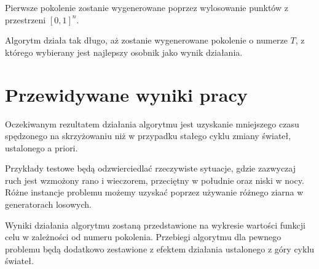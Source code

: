\documentclass[a4paper]{article}
\begin{document}
Pierwsze pokolenie zostanie wygenerowane poprzez wylosowanie punktów z
przestrzeni $[0, 1]^n$.

Algorytm działa tak długo, aż zostanie wygenerowane pokolenie o numerze $T$,
z którego wybierany jest najlepszy osobnik jako wynik działania.

\section{Przewidywane wyniki pracy}
Oczekiwanym rezultatem działania algorytmu jest uzyskanie mniejszego czasu
spędzonego na skrzyżowaniu niż w przypadku stałego cyklu zmiany świateł,
ustalonego a priori.

Przykłady testowe będą odzwierciedlać rzeczywiste sytuacje, gdzie zazwyczaj
ruch jest wzmożony rano i wieczorem, przeciętny w południe oraz niski w nocy.
Różne instancje problemu możemy uzyskać poprzez używanie różnego ziarna
w generatorach losowych.

Wyniki działania algorytmu zostaną przedstawione na wykresie wartości funkcji
celu w zależności od numeru pokolenia. Przebiegi algorytmu dla pewnego problemu
będą dodatkowo zestawione z efektem działania ustalonego z góry cyklu świateł.
\end{document}
